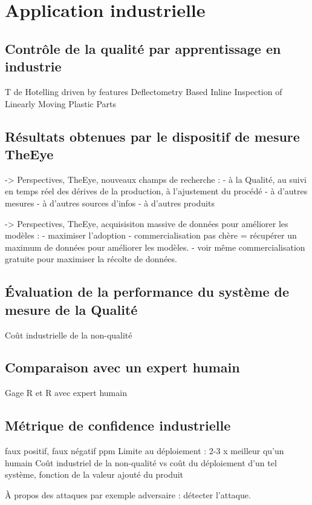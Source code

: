 \section{Application industrielle}

\subsection{Contrôle de la qualité par apprentissage en industrie}
\cite{goto_anomaly_2019} T de Hotelling
\cite{fantinel_visual_2019} driven by features
\cite{meguenani_deflectometry_2019} Deflectometry Based Inline Inspection of Linearly Moving Plastic Parts


\subsection{Résultats obtenues par le dispositif de mesure TheEye}
-> Perspectives, TheEye, nouveaux champs de recherche :
- à la Qualité, au suivi en temps réel des dérives de la production, à l'ajustement du procédé
- à d'autres mesures
- à d'autres sources d'infos
- à d'autres produits

-> Perspectives, TheEye, acquisisiton massive de données pour améliorer les modèles :
- maximiser l'adoption
- commercialisation pas chère = récupérer un maximum de données pour améliorer les modèles.
- voir même commercialisation gratuite pour maximiser la récolte de données.



\begin{raggedright}
\section{Évaluation de la performance du système de mesure de la Qualité}
\end{raggedright}
Coût industrielle de la non-qualité

\subsection{Comparaison avec un expert humain}
Gage R et R avec expert humain

\subsection{Métrique de confidence industrielle}
faux positif, faux négatif
ppm
Limite au déploiement : 2-3 x meilleur qu'un humain
Coût industriel de la non-qualité vs coût du déploiement d'un tel système, fonction de la valeur ajouté du produit

À propos des attaques par exemple adversaire : détecter l'attaque.
